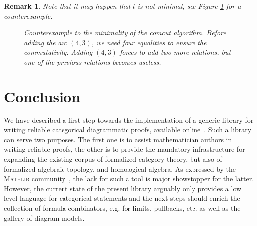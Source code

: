 \documentclass[10pt,a4paper]{article}
\newtheorem{remark}[theorem]{Remark}
\newcommand{\eg}{e.g.}
\renewcommand{\~}{\widetilde}
\begin{document}
\begin{remark}
Note that it may happen that $l$ is not minimal, see Figure \ref{fig:counter-example_comcut} for a counterexample.
\begin{figure}[h]
  \begin{center}
  \end{center}
  \caption{Counterexample to the minimality of the comcut algorithm. Before adding the arc $(4,3)$, we need four equalities to ensure the commutativity. Adding $(4,3)$ forces to add two more relations, but one of the previous relations becomes useless. \label{fig:counter-example_comcut}}
\end{figure}
\end{remark}





\section{Conclusion}\label{sec:concl}

We have described a first step towards the implementation of a generic library for writing reliable categorical diagrammatic proofs, available online~\cite{repo}. Such a library can serve two purposes. The first one is to assist mathematician authors in writing reliable proofs, the other is to provide the mandatory infrastructure for expanding the existing corpus of formalized category theory, but also of formalized algebraic topology, and homological algebra. As expressed by the \textsc{Mathlib} community~\cite{mathlibzulip}, the lack for such a tool is major showstopper for the latter. However, the current state of the present library arguably only provides a low level language for categorical statements and the next steps should enrich the collection of formula combinators, \eg{} for limits, pullbacks, etc. as well as the gallery of diagram models.
\end{document}
